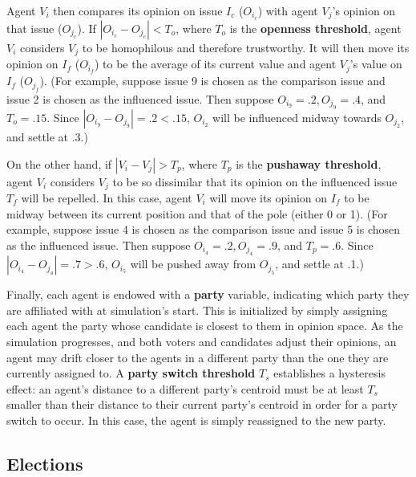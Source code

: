 Agent $V_i$ then compares its opinion on issue $I_c$ ($O_{i_c}$) with agent
$V_j$'s opinion on that issue ($O_{j_c}$). If $|O_{i_c} - O_{j_c}| < T_o$,
where $T_o$ is the \textbf{openness threshold}, agent $V_i$ considers $V_j$ to
be homophilous and therefore trustworthy. It will then move its opinion on
$I_f$ ($O_{i_f}$) to be the average of its current value and agent $V_j$'s
value on $I_f$ ($O_{j_f}$). (For example, suppose issue 9 is chosen as the
comparison issue and issue 2 is chosen as the influenced issue. Then suppose
$O_{i_9} = .2, O_{j_9} = .4$, and $T_o = .15$. Since $|O_{i_9} - O_{j_9}| = .2
< .15$, $O_{i_2}$ will be influenced midway towards $O_{j_2}$, and settle at
.3.)

On the other hand, if $|V_i - V_j| > T_p$, where $T_p$ is the \textbf{pushaway
threshold}, agent $V_i$ considers $V_j$ to be so dissimilar that its opinion on
the influenced issue $T_f$ will be repelled. In this case, agent $V_i$ will
move its opinion on $I_f$ to be midway between its current position and that of
the pole (either 0 or 1). (For example, suppose issue 4 is chosen as the
comparison issue and issue 5 is chosen as the influenced issue. Then suppose
$O_{i_4} = .2, O_{j_4} = .9$, and $T_p = .6$. Since $|O_{i_4} - O_{j_4}| = .7
> .6$, $O_{i_5}$ will be pushed away from $O_{j_5}$, and settle at .1.)

Finally, each agent is endowed with a \textbf{party} variable, indicating which
party they are affiliated with at simulation's start. This is initialized by
simply assigning each agent the party whose candidate is closest to them in
opinion space. As the simulation progresses, and both voters and candidates
adjust their opinions, an agent may drift closer to the agents in a different
party than the one they are currently assigned to. A \textbf{party switch
threshold} $T_s$ establishes a hysteresis effect: an agent's distance to a
different party's centroid must be at least $T_s$ smaller than their distance
to their current party's centroid in order for a party switch to occur. In this
case, the agent is simply reassigned to the new party.

\subsection{Elections}

